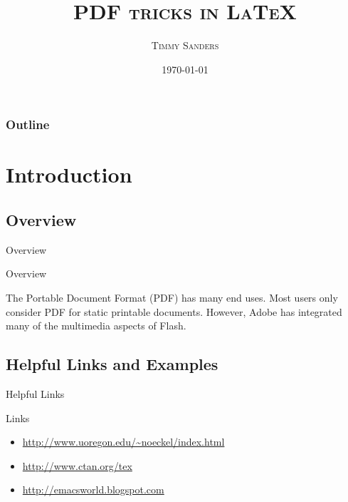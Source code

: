 \documentclass[article]{beamer}
\title{\textsc{PDF tricks in \LaTeX}}
\author[Timmy Sanders]{\textsc{Timmy Sanders}}
\institute{\textsc{Department of Mathematics and Statistics\\Auburn University}}
\date{\textsc{\scriptsize{\today}}}
\begin{document}
\maketitle

\begin{frame}[fragile]
\frametitle{Outline}
\tableofcontents
\end{frame}

\section{Introduction}
\subsection{Overview}

\begin{frame}[fragile]{Overview}

\begin{block}{Overview}

The Portable Document Format (PDF) has many end uses. Most users only consider PDF for static printable documents. However, Adobe has integrated many of the multimedia aspects of Flash.

\end{block}

\end{frame}

\subsection{Helpful Links and Examples}

\begin{frame}[fragile]{Helpful Links}

\begin{block}{Links}

\begin{itemize}

\item{\url{http://www.uoregon.edu/~noeckel/index.html}}
\item{\url{http://www.ctan.org/tex}}
\item{\url{http://emacsworld.blogspot.com}}

\end{itemize}

\end{block}

\end{frame}
\end{document}
